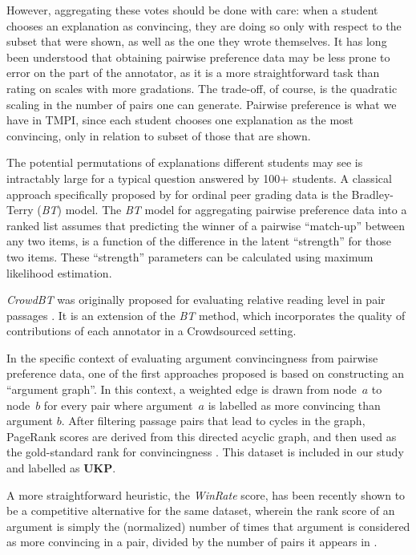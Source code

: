 \documentclass[notitlepage,12pt]{jedm}
\begin{document}
However, aggregating these votes should be done with care: when a student 
chooses an explanation as convincing, they are doing so only with respect to 
the subset that were shown, as well as the one they wrote themselves.
%
%
It has long been understood that obtaining pairwise preference data may be 
less prone to error on the part of the annotator, as it is a more straightforward task than 
rating on scales with more gradations.
The trade-off, of course, is the quadratic scaling in the number of pairs one 
can generate. 
Pairwise preference is what we have in TMPI, since each student chooses one explanation as 
the most convincing, only in relation to subset of those that are shown. 

The potential permutations of explanations different students may see is 
intractably large for a typical question answered by 100+ students.
A classical approach specifically proposed by  for 
ordinal peer grading data is the Bradley-Terry (\textit{BT}) model.
The \textit{BT} model \cite{bradley_rank_1952} for aggregating pairwise 
preference data into a ranked list assumes that predicting the winner of a 
pairwise ``match-up'' between any two items, is a function of the difference 
in the latent ``strength'' for those two items. 
These ``strength'' parameters can be calculated using maximum likelihood 
estimation.

\textit{CrowdBT} was originally proposed for evaluating relative reading level in pair
passages \cite{chen_pairwise_2013}. It is an extension of the \textit{BT} method, which
incorporates the quality of contributions of each annotator in a Crowdsourced setting.

In the specific context of evaluating argument convincingness from pairwise preference data,
one of the first approaches proposed is based on constructing an ``argument graph''.  In
this context, a weighted edge is drawn from node~$a$ to node~$b$ for every pair where
argument~$a$ is labelled as more convincing than argument $b$.  After filtering passage
pairs that lead to cycles in the graph, PageRank scores are derived from this directed
acyclic graph, and then used as the gold-standard rank for convincingness
\cite{habernal_which_2016}.  This dataset is included in our study and labelled as
\textbf{UKP}.

A more straightforward heuristic, the \textit{WinRate} score, has been recently
shown to be a competitive alternative for the same dataset, wherein the rank 
score of an argument is simply the (normalized) number of times that argument 
is considered as more convincing in a pair, divided by the number of pairs it 
appears in .
\end{document}
